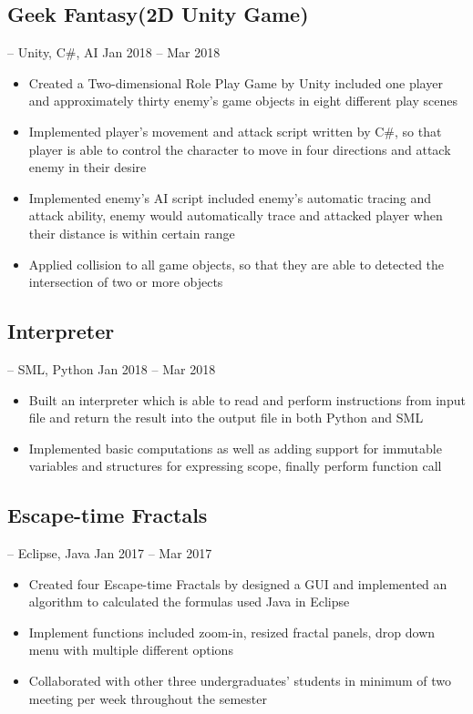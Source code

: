 \documentclass[11pt, letterpaper]{article} %
\begin{document}
\subsection{Geek Fantasy(2D Unity Game)}
-- Unity, C\#, AI
\hspace*{\fill}Jan 2018 -- Mar 2018
\vspace{-0.8em}
\begin{itemize}
	\setlength\itemsep{-0.5em}
	\item Created a Two-dimensional Role Play Game by Unity included one player and approximately thirty enemy's game objects in eight different play scenes
	\item Implemented player’s movement and attack script written by C\#, so that player is able to control the character to move in four directions and attack enemy in their desire
	\item Implemented enemy’s AI script included enemy’s automatic tracing and attack ability, enemy would automatically trace and attacked player when their distance is within certain range
	\item Applied collision to all game objects, so that they are able to detected the intersection of two or more objects
\end{itemize}
\vspace{-0.8em}

\subsection{Interpreter}
-- SML, Python
\hspace*{\fill}Jan 2018 -- Mar 2018
\vspace{-0.8em}
\begin{itemize}
	\setlength\itemsep{-0.5em}
	\item Built an interpreter which is able to read and perform instructions from input file and return the result into the output file in both Python and SML
	\item Implemented basic computations as well as adding support for immutable variables and structures for expressing scope, finally perform function call
\end{itemize}
\vspace{-0.8em}

\subsection{Escape-time Fractals}
-- Eclipse, Java
\hspace*{\fill}Jan 2017 -- Mar 2017
\vspace{-0.8em}
\begin{itemize}
	\setlength\itemsep{-0.5em}
	\item Created four Escape-time Fractals by designed a GUI and implemented an algorithm to calculated the formulas used Java in Eclipse
	\item Implement functions included zoom-in, resized fractal panels, drop down menu with multiple different options
	\item Collaborated with other three undergraduates' students in minimum of two meeting per week throughout the semester
\end{itemize}
\end{document}
